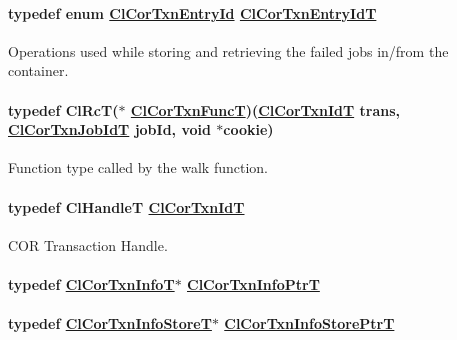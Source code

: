 \hypertarget{group__group13_ga42}{
\paragraph[ClCorTxnEntryIdT]{\setlength{\rightskip}{0pt plus 5cm}typedef enum \hyperlink{group__group13_ga338}{Cl\-Cor\-Txn\-Entry\-Id} \hyperlink{group__group13_ga42}{Cl\-Cor\-Txn\-Entry\-Id\-T}}\hfill}
\label{group__group13_ga42}


Operations used while storing and retrieving the failed jobs in/from the container. \hypertarget{group__group13_ga60}{
\paragraph[ClCorTxnFuncT]{\setlength{\rightskip}{0pt plus 5cm}typedef Cl\-Rc\-T($\ast$ \hyperlink{group__group13_ga60}{Cl\-Cor\-Txn\-Func\-T})(\hyperlink{group__group13_ga17}{Cl\-Cor\-Txn\-Id\-T} trans, \hyperlink{group__group13_ga18}{Cl\-Cor\-Txn\-Job\-Id\-T} job\-Id, void $\ast$cookie)}\hfill}
\label{group__group13_ga60}


Function type called by the walk function. \hypertarget{group__group13_ga17}{
\paragraph[ClCorTxnIdT]{\setlength{\rightskip}{0pt plus 5cm}typedef Cl\-Handle\-T \hyperlink{group__group13_ga17}{Cl\-Cor\-Txn\-Id\-T}}\hfill}
\label{group__group13_ga17}


COR Transaction Handle. \hypertarget{group__group13_ga41}{
\paragraph[ClCorTxnInfoPtrT]{\setlength{\rightskip}{0pt plus 5cm}typedef \hyperlink{struct_cl_cor_txn_info}{Cl\-Cor\-Txn\-Info\-T}$\ast$ \hyperlink{struct_cl_cor_txn_info}{Cl\-Cor\-Txn\-Info\-Ptr\-T}}\hfill}
\label{group__group13_ga41}


\hypertarget{group__group13_ga44}{
\paragraph[ClCorTxnInfoStorePtrT]{\setlength{\rightskip}{0pt plus 5cm}typedef \hyperlink{struct_cl_cor_txn_info_store}{Cl\-Cor\-Txn\-Info\-Store\-T}$\ast$ \hyperlink{struct_cl_cor_txn_info_store}{Cl\-Cor\-Txn\-Info\-Store\-Ptr\-T}}\hfill}
\label{group__group13_ga44}


